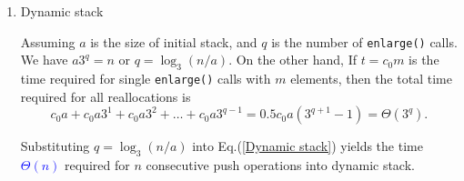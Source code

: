 \documentclass[12pt]{article}
\begin{document}
\begin{enumerate}
\item Dynamic stack\par

Assuming $a$ is the size of initial stack, and $q$ is the number of \texttt{enlarge()} calls.
We have $a3^{q}=n$ or $q=\log_{3}(n/a)$. On the other hand, If $t=c_{0}m$ is the time required for single \texttt{enlarge()} calls with $m$ elements, then the total time required for all reallocations is
\begin{equation}
c_{0}a+c_{0}a3^1+c_{0}a3^2+\dots+c_{0}a3^{q-1}=0.5c_{0}a\left(3^{q+1}-1\right)=\Theta(3^{q}).
\label{Dynamic stack}
\end{equation}

Substituting $q=\log_{3}(n/a)$ into Eq.(\ref{Dynamic stack}) yields the time \textcolor{blue}{$\Theta(n)$} required for $n$ consecutive push operations into dynamic stack.
\end{enumerate}
\end{document}
